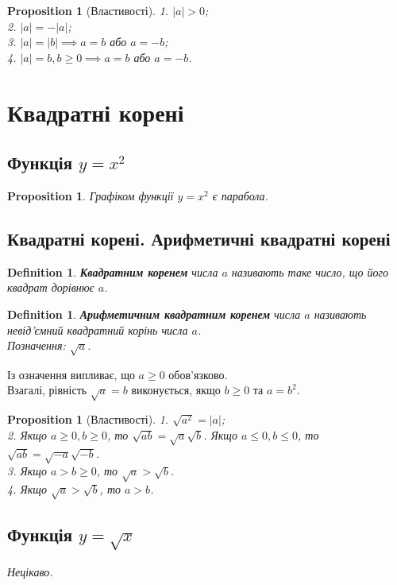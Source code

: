 \documentclass[a4paper, 10pt]{article}
\theoremstyle{theoremdd}
\theoremstyle{theoremdd}
\newtheorem{definition}[theorem]{Definition}
\theoremstyle{theoremdd}
\theoremstyle{theoremdd}
\theoremstyle{theoremdd}
\newtheorem{proposition}[theorem]{Proposition}
\theoremstyle{theoremdd}
\theoremstyle{theoremdd}
\theoremstyle{theoremdd}
\begin{document}
\begin{proposition}[Властивості]
1. $|a| > 0$;\\
2. $|a| = -|a|$;\\
3. $|a| = |b| \implies a = b$ або $a = -b$;\\
4. $|a| = b, b \geq 0 \implies a = b$ або $a = -b$.
\end{proposition}
\newpage

\section{Квадратні корені}
\subsection{Функція $y = x^2$}
\begin{proposition}
Графіком функції $y = x^2$ є парабола.
\end{proposition}

\subsection{Квадратні корені. Арифметичні квадратні корені}
\begin{definition}
\textbf{Квадратним коренем} числа $a$ називають таке число, що його квадрат дорівнює $a$.
\end{definition}

\begin{definition}
\textbf{Арифметичним квадратним коренем} числа $a$ називають невід'ємний квадратний корінь числа $a$.\\
Позначення: $\sqrt{a}$.
\end{definition}
Із означення випливає, що $a \geq 0$ обов'язково.
\bigskip \\
Взагалі, рівність $\sqrt{a} = b$ виконується, якщо $b \geq 0$ та $a = b^2$.

\begin{proposition}[Властивості]
1. $\sqrt{a^2} = |a|$;\\
2. Якщо $a\geq 0, b \geq 0$, то $\sqrt{ab} = \sqrt{a} \sqrt{b}$. Якщо $a \leq 0, b \leq 0$, то $\sqrt{ab} = \sqrt{-a} \sqrt{-b}$.\\
3. Якщо $a > b \geq 0$, то $\sqrt{a} > \sqrt{b}$.\\
4. Якщо $\sqrt{a} > \sqrt{b}$, то $a > b$.
\end{proposition}

\subsection{Функція $y = \sqrt{x}$}
\textit{Нецікаво.}
\end{document}
